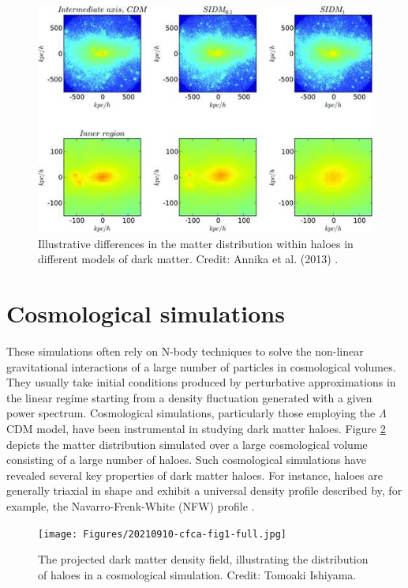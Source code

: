 \begin{figure}
    \centering
    \includegraphics[width=0.8\linewidth]{Figures/dm-models-halo-illus.jpeg}
    \caption{Illustrative differences in the matter distribution within haloes in different models of dark matter. Credit: Annika et al. (2013) \citep{2013MNRAS.430..105P}.}
    \label{fig:dm-models-haloes}
\end{figure}

\section{Cosmological simulations}

These simulations often rely on N-body techniques to solve the non-linear gravitational interactions of a large number of particles in cosmological volumes. They usually take initial conditions produced by perturbative approximations in the linear regime starting from a density fluctuation generated with a given power spectrum. Cosmological simulations, particularly those employing the $\Lambda$CDM model, have been instrumental in studying dark matter haloes. Figure \ref{fig:dm-cosmo-sims-haloes} depicts the matter distribution simulated over a large cosmological volume consisting of a large number of haloes. Such cosmological simulations have revealed several key properties of dark matter haloes. For instance, haloes are generally triaxial in shape \citep[][]{1988ApJ...327..507F} and exhibit a universal density profile described by, for example, the Navarro-Frenk-White (NFW) profile \citep{1996ApJ...462..563N,1997ApJ...490..493N,2010MNRAS.402...21N}.

\begin{figure}
\centering
\texttt{[image: Figures/20210910-cfca-fig1-full.jpg]}
\caption{The projected dark matter density field, illustrating the distribution of haloes in a cosmological simulation. Credit: Tomoaki Ishiyama.}
\label{fig:dm-cosmo-sims-haloes}
\end{figure}

